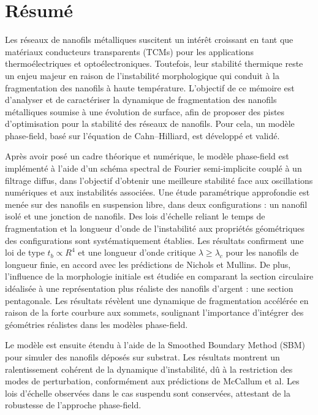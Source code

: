 \chapter*{Résumé}
Les réseaux de nanofils métalliques suscitent un intérêt croissant en tant que matériaux conducteurs transparents (TCMs) pour les applications thermoélectriques et optoélectroniques. Toutefois, leur stabilité thermique reste un enjeu majeur en raison de l’instabilité morphologique qui conduit à la fragmentation des nanofils à haute température. L’objectif de ce mémoire est d’analyser et de caractériser la dynamique de fragmentation des nanofils métalliques soumise à une évolution de surface, afin de proposer des pistes d’optimisation pour la stabilité des réseaux de nanofils. Pour cela, un modèle phase-field, basé sur l’équation de Cahn–Hilliard, est développé et validé.

Après avoir posé un cadre théorique et numérique, le modèle phase-field est implémenté à l’aide d’un schéma spectral de Fourier semi-implicite couplé à un filtrage diffus, dans l'objectif d'obtenir une meilleure stabilité face aux oscillations numériques et aux instabilités associées. Une étude paramétrique approfondie est menée sur des nanofils en suspension libre, dans deux configurations : un nanofil isolé et une jonction de nanofils. Des lois d’échelle reliant le temps de fragmentation et la longueur d’onde de l’instabilité aux propriétés géométriques des configurations sont systématiquement établies. Les résultats confirment une loi de type $t_b \propto R^4$ et une longueur d’onde critique $\lambda \geq \lambda_c$ pour les nanofils de longueur finie, en accord avec les prédictions de Nichols et Mullins. De plus, l’influence de la morphologie initiale est étudiée en comparant la section circulaire idéalisée à une représentation plus réaliste des nanofils d’argent : une section pentagonale. Les résultats révèlent une dynamique de fragmentation accélérée en raison de la forte courbure aux sommets, soulignant l’importance d’intégrer des géométries réalistes dans les modèles phase-field.

Le modèle est ensuite étendu à l’aide de la Smoothed Boundary Method (SBM) pour simuler des nanofils déposés sur substrat. Les résultats montrent un ralentissement cohérent de la dynamique d’instabilité, dû à la restriction des modes de perturbation, conformément aux prédictions de McCallum et al. Les lois d’échelle observées dans le cas suspendu sont conservées, attestant de la robustesse de l’approche phase-field.

